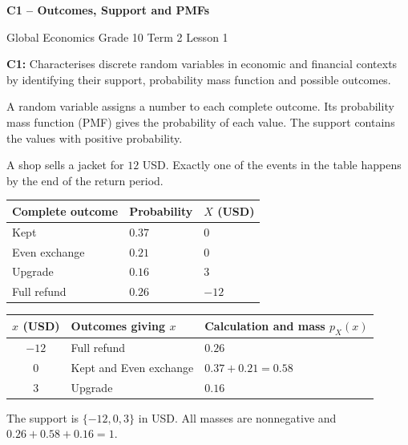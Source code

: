 {\centering
    {\Large\bfseries C1 -- Outcomes, Support and PMFs\par}
    Global Economics \textbar{} Grade 10 \textbar{} Term 2 \textbar{} Lesson 1\par
}

\textbf{C1:} Characterises discrete random variables in economic and financial contexts by identifying their support, probability mass function and possible outcomes.

A random variable assigns a number to each complete outcome. Its probability mass function (PMF) gives the probability of each value. The support contains the values with positive probability.


	A shop sells a jacket for \(12\) USD. Exactly one of the events in the table happens by the end of the return period.

\noindent
\begin{minipage}[t]{0.48\linewidth}
	
	\begin{tabularx}{\linewidth}{|l|Y|Y|}
		\hline
		Complete outcome & Probability & \(X\) (USD) \\ \hline
		Kept & \(0.37\) & \(0\) \\ \hline
		Even exchange & \(0.21\) & \(0\) \\ \hline
		Upgrade & \(0.16\) & \(3\) \\ \hline
		Full refund & \(0.26\) & \(-12\) \\ \hline
	\end{tabularx}
\end{minipage}
\hfill
\begin{minipage}[t]{0.48\linewidth}
	
	\begin{tabularx}{\linewidth}{|c|Y|Y|}
		\hline
		\(x\) (USD) & Outcomes giving \(x\) & Calculation and mass \(p_X(x)\) \\ \hline
		\(-12\) & Full refund & \(0.26\) \\ \hline
		\(0\) & Kept and Even exchange & \(0.37+0.21\)\newline \(=0.58\) \\ \hline
		\(3\) & Upgrade & \(0.16\) \\ \hline
	\end{tabularx}
	
	\medskip
	The support is \(\{-12,0,3\}\) in USD.
	All masses are nonnegative and
	\(0.26+0.58+0.16=1\).
\end{minipage}

